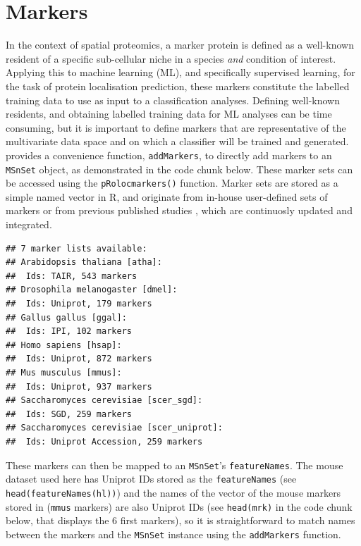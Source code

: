 \pagebreak

\section*{Markers}

In the context of spatial proteomics, a marker protein is defined as a
well-known resident of a specific sub-cellular niche in a species
\textit{and} condition of interest. Applying this to machine learning
(ML), and specifically supervised learning, for the task of protein
localisation prediction, these markers constitute the labelled
training data to use as input to a classification analyses. Defining
well-known residents, and obtaining labelled training data for ML
analyses can be time consuming, but it is important to define markers
that are representative of the multivariate data space and on which a
classifier will be trained and generated.  provides a
convenience function, \texttt{addMarkers}, to directly add markers to
an \texttt{MSnSet} object, as demonstrated in the code chunk
below. These marker sets can be accessed using the
\texttt{pRolocmarkers()} function. Marker sets are stored as a simple
named vector in R, and originate from in-house user-defined sets of
markers or from previous published studies \cite{Gatto:2014b}, which
are continuosly updated and integrated.

\begin{knitrout}
\color{fgcolor}\begin{kframe}
\begin{alltt}
\hlstd{()}
\end{alltt}
\begin{verbatim}
## 7 marker lists available:
## Arabidopsis thaliana [atha]:
##  Ids: TAIR, 543 markers
## Drosophila melanogaster [dmel]:
##  Ids: Uniprot, 179 markers
## Gallus gallus [ggal]:
##  Ids: IPI, 102 markers
## Homo sapiens [hsap]:
##  Ids: Uniprot, 872 markers
## Mus musculus [mmus]:
##  Ids: Uniprot, 937 markers
## Saccharomyces cerevisiae [scer_sgd]:
##  Ids: SGD, 259 markers
## Saccharomyces cerevisiae [scer_uniprot]:
##  Ids: Uniprot Accession, 259 markers
\end{verbatim}
\end{kframe}
\end{knitrout}

These markers can then be mapped to an \texttt{MSnSet}'s
\texttt{featureNames}. The mouse dataset used here has Uniprot IDs
stored as the \texttt{featureNames} (see
\texttt{head(featureNames(hl))}) and the names of the vector of the
mouse markers stored in  (\texttt{mmus} markers) are
also Uniprot IDs (see \texttt{head(mrk)} in the code chunk below, that
displays the 6 first markers), so it is straightforward to match names
between the markers and the \texttt{MSnSet} instance using the
\texttt{addMarkers} function.

